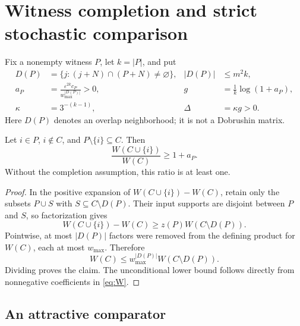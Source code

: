 \section{Witness completion and strict stochastic comparison}\label{sec:comparison}

Fix a nonempty witness \(P\), let \(k=|P|\), and put
\begin{align}
 D(P)&=\{j:(j+N)\cap(P+N)\ne\varnothing\},&
 |D(P)|&\le m^2k,\label{eq:D}\\
 a_P&=\frac{\varepsilon^{2k}c_P}{w_{\max}^{|D(P)|}}>0,&
 g&=\frac1k\log(1+a_P),\label{eq:g}\\
 \kappa&=3^{-(k-1)},&
 \Delta&=\kappa g>0.\label{eq:Delta}
\end{align}
Here \(D(P)\) denotes an overlap neighborhood; it is not a Dobrushin matrix.

\begin{lemma}\label{lem:completion}
Let \(i\in P\), \(i\notin C\), and \(P\setminus\{i\}\subseteq C\). Then
\begin{equation}
 \frac{W(C\cup\{i\})}{W(C)}\ge1+a_P.
 \label{eq:completion}
\end{equation}
Without the completion assumption, this ratio is at least one.
\end{lemma}
\begin{proof}
In the positive expansion of \(W(C\cup\{i\})-W(C)\), retain only the subsets \(P\cup S\) with \(S\subseteq C\setminus D(P)\). Their input supports are disjoint between \(P\) and \(S\), so factorization gives
\begin{equation}
 W(C\cup\{i\})-W(C)
 \ge z(P)W(C\setminus D(P)).
\end{equation}
Pointwise, at most \(|D(P)|\) factors were removed from the defining product for \(W(C)\), each at most \(w_{\max}\). Therefore
\begin{equation}
 W(C)\le w_{\max}^{|D(P)|}W(C\setminus D(P)).
\end{equation}
Dividing proves the claim. The unconditional lower bound follows directly from nonnegative coefficients in \eqref{eq:W}.
\end{proof}

\subsection{An attractive comparator}

